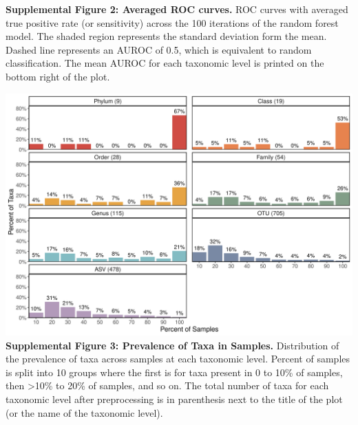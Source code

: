 \documentclass[
]{article}
\begin{document}
\textbf{Supplemental Figure 2: Averaged ROC curves.} ROC curves with
averaged true positive rate (or sensitivity) across the 100 iterations
of the random forest model. The shaded region represents the standard
deviation form the mean. Dashed line represents an AUROC of 0.5, which
is equivalent to random classification. The mean AUROC for each
taxonomic level is printed on the bottom right of the plot.

\newpage

\includegraphics[width=\textwidth,height=0.45\textheight]{figure_s3.png}\\
\textbf{Supplemental Figure 3: Prevalence of Taxa in Samples.}
Distribution of the prevalence of taxa across samples at each taxonomic
level. Percent of samples is split into 10 groups where the first is for
taxa present in 0 to 10\% of samples, then \textgreater10\% to 20\% of
samples, and so on. The total number of taxa for each taxonomic level
after preprocessing is in parenthesis next to the title of the plot (or
the name of the taxonomic level).

\newpage
\end{document}
